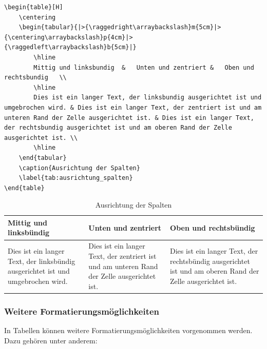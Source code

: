 \begin{lstlisting}[language={[LaTeX]TeX}, basicstyle=\footnotesize]
\begin{table}[H]
    \centering
    \begin{tabular}{|>{\raggedright\arraybackslash}m{5cm}|>{\centering\arraybackslash}p{4cm}|>{\raggedleft\arraybackslash}b{5cm}|}
        \hline
        Mittig und linksbundig  &   Unten und zentriert &   Oben und rechtsbundig   \\
        \hline
        Dies ist ein langer Text, der linksbundig ausgerichtet ist und umgebrochen wird. & Dies ist ein langer Text, der zentriert ist und am unteren Rand der Zelle ausgerichtet ist. & Dies ist ein langer Text, der rechtsbundig ausgerichtet ist und am oberen Rand der Zelle ausgerichtet ist. \\
        \hline
    \end{tabular}
    \caption{Ausrichtung der Spalten}
    \label{tab:ausrichtung_spalten}
\end{table}
\end{lstlisting}

\begin{table}[H]
    \centering
    \begin{tabular}{|>{\raggedright\arraybackslash}m{5cm}|>{\centering\arraybackslash}p{4cm}|>{\raggedleft\arraybackslash}b{5cm}|}
        \hline
        \textbf{Mittig und linksbündig}                                                  & \textbf{Unten und zentriert}                                                                & \textbf{Oben und rechtsbündig}                                                                             \\
        \hline
        Dies ist ein langer Text, der linksbündig ausgerichtet ist und umgebrochen wird. & Dies ist ein langer Text, der zentriert ist und am unteren Rand der Zelle ausgerichtet ist. & Dies ist ein langer Text, der rechtsbündig ausgerichtet ist und am oberen Rand der Zelle ausgerichtet ist. \\
        \hline
    \end{tabular}
    \caption{Ausrichtung der Spalten}
    \label{tab:ausrichtung_spalten}
\end{table}

\subsubsection{Weitere Formatierungsmöglichkeiten}
In Tabellen können weitere Formatierungsmöglichkeiten vorgenommen werden. Dazu gehören unter anderem:

